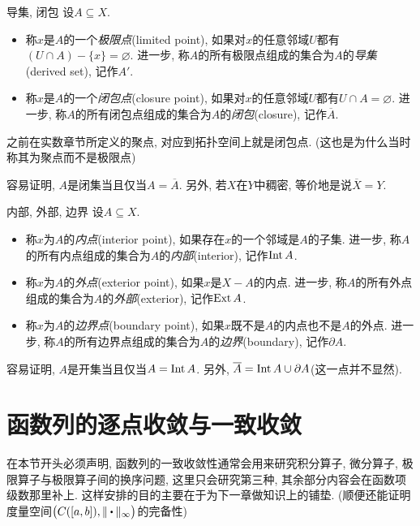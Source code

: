 \begin{definition}{导集, 闭包}
	设$A \subseteq X$. 
	\begin{itemize}
		\item 称$x$是$A$的一个\textit{极限点}(limited point), 如果对$x$的任意邻域$U$都有$(U \cap A) - \{ x \} = \varnothing$. 进一步, 称$A$的所有极限点组成的集合为$A$的\textit{导集}(derived set), 记作$A'$. 
		\item 称$x$是$A$的一个\textit{闭包点}(closure point), 如果对$x$的任意邻域$U$都有$U \cap A = \varnothing$. 进一步, 称$A$的所有闭包点组成的集合为$A$的\textit{闭包}(closure), 记作$\overline{A}$. 
	\end{itemize}
\end{definition}
\begin{remark}
	之前在实数章节所定义的聚点, 对应到拓扑空间上就是闭包点. (这也是为什么当时称其为聚点而不是极限点)
\end{remark}

容易证明, $A$是闭集当且仅当$A=\overline{A}$. 另外, 若$X$在$Y$中稠密, 等价地是说$\overline{X}=Y$. 

\begin{definition}{内部, 外部, 边界}
	设$A \subseteq X$. 
	\begin{itemize}
		\item 称$x$为$A$的\textit{内点}(interior point), 如果存在$x$的一个邻域是$A$的子集. 进一步, 称$A$的所有内点组成的集合为$A$的\textit{内部}(interior), 记作$\operatorname{Int} A$. 
		\item 称$x$为$A$的\textit{外点}(exterior point), 如果$x$是$X-A$的内点. 进一步, 称$A$的所有外点组成的集合为$A$的\textit{外部}(exterior), 记作$\operatorname{Ext} A$. 
		\item 称$x$为$A$的\textit{边界点}(boundary point), 如果$x$既不是$A$的内点也不是$A$的外点. 进一步, 称$A$的所有边界点组成的集合为$A$的\textit{边界}(boundary), 记作$\partial A$. 
	\end{itemize}
\end{definition}

容易证明, $A$是开集当且仅当$A= \operatorname{Int} A$. 另外, $\overline{A} = \operatorname{Int} A \cup \partial A$(这一点并不显然). 



\newpage
\section{函数列的逐点收敛与一致收敛}

在本节开头必须声明, 函数列的一致收敛性通常会用来研究积分算子, 微分算子, 极限算子与极限算子间的换序问题, 这里只会研究第三种, 其余部分内容会在函数项级数那里补上. 这样安排的目的主要在于为下一章做知识上的铺垫. (顺便还能证明度量空间$\big( C([a,b]),\| \bigcdot \|_{\infty} \big)$的完备性)

